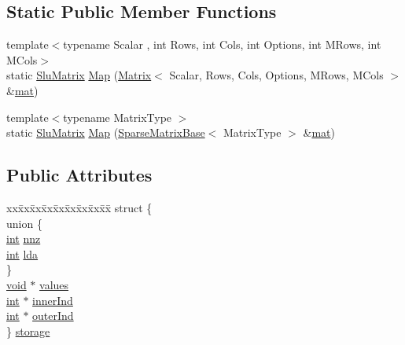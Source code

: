 \subsection*{Static Public Member Functions}
\begin{DoxyCompactItemize}
\item 
{\footnotesize template$<$typename Scalar , int Rows, int Cols, int Options, int M\-Rows, int M\-Cols$>$ }\\static \hyperlink{struct_slu_matrix}{Slu\-Matrix} \hyperlink{struct_slu_matrix_a08f46c1693f54aa3329d0d7a3a570839}{Map} (\hyperlink{class_matrix}{Matrix}$<$ Scalar, Rows, Cols, Options, M\-Rows, M\-Cols $>$ \&\hyperlink{uavobjecttemplate_8m_a16a51e808b16c46bbfd36da2e37cd123}{mat})
\item 
{\footnotesize template$<$typename Matrix\-Type $>$ }\\static \hyperlink{struct_slu_matrix}{Slu\-Matrix} \hyperlink{struct_slu_matrix_a9c7c82166aae4eaf4392eef34918ee2b}{Map} (\hyperlink{class_sparse_matrix_base}{Sparse\-Matrix\-Base}$<$ Matrix\-Type $>$ \&\hyperlink{uavobjecttemplate_8m_a16a51e808b16c46bbfd36da2e37cd123}{mat})
\end{DoxyCompactItemize}
\subsection*{Public Attributes}
\begin{DoxyCompactItemize}
\item 
\begin{tabbing}
xx\=xx\=xx\=xx\=xx\=xx\=xx\=xx\=xx\=\kill
struct \{\\
\>union \{\\
\>\>\hyperlink{ioapi_8h_a787fa3cf048117ba7123753c1e74fcd6}{int} \hyperlink{struct_slu_matrix_a8c6e4763eb741f70ff9a9e8a134cdad7}{nnz}\\
\>\>\hyperlink{ioapi_8h_a787fa3cf048117ba7123753c1e74fcd6}{int} \hyperlink{struct_slu_matrix_aafad0ef506998d9eb30fa0277dd08062}{lda}\\
\>\} \\
\>\hyperlink{group___u_a_v_objects_plugin_ga444cf2ff3f0ecbe028adce838d373f5c}{void} $\ast$ \hyperlink{struct_slu_matrix_a37224218289d334e09951e155eb84056}{values}\\
\>\hyperlink{ioapi_8h_a787fa3cf048117ba7123753c1e74fcd6}{int} $\ast$ \hyperlink{struct_slu_matrix_a2c325b4cb036ea1d302ee015f2c0a08f}{innerInd}\\
\>\hyperlink{ioapi_8h_a787fa3cf048117ba7123753c1e74fcd6}{int} $\ast$ \hyperlink{struct_slu_matrix_a167728f62bf61278d35b56e3f7daf1fb}{outerInd}\\
\} \hyperlink{struct_slu_matrix_a91687a51dc449ea194d400e8ae469645}{storage}\\

\end{tabbing}\end{DoxyCompactItemize}


